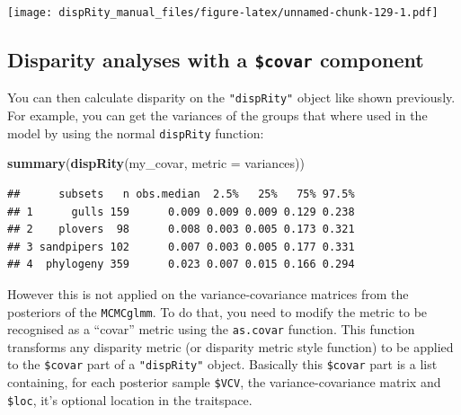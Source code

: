 \documentclass[
]{book}
\newenvironment{Shaded}{\begin{snugshade}}{\end{snugshade}}
\newcommand{\CommentTok}[1]{\textcolor[rgb]{0.56,0.35,0.01}{\textit{#1}}}
\newcommand{\DataTypeTok}[1]{\textcolor[rgb]{0.13,0.29,0.53}{#1}}
\newcommand{\DecValTok}[1]{\textcolor[rgb]{0.00,0.00,0.81}{#1}}
\newcommand{\KeywordTok}[1]{\textcolor[rgb]{0.13,0.29,0.53}{\textbf{#1}}}
\newcommand{\NormalTok}[1]{#1}
\newcommand{\OperatorTok}[1]{\textcolor[rgb]{0.81,0.36,0.00}{\textbf{#1}}}
\newcommand{\StringTok}[1]{\textcolor[rgb]{0.31,0.60,0.02}{#1}}
\begin{document}
\texttt{[image: dispRity\_manual\_files/figure-latex/unnamed-chunk-129-1.pdf]}

\hypertarget{disparity-analyses-with-a-covar-component}{%
\subsection{\texorpdfstring{Disparity analyses with a \texttt{\$covar} component}{Disparity analyses with a \$covar component}}\label{disparity-analyses-with-a-covar-component}}

You can then calculate disparity on the \texttt{"dispRity"} object like shown previously.
For example, you can get the variances of the groups that where used in the model by using the normal \texttt{dispRity} function:

\begin{Shaded}
\begin{Highlighting}[]
\KeywordTok{summary}\NormalTok{(}\KeywordTok{dispRity}\NormalTok{(my\_covar, }\DataTypeTok{metric =}\NormalTok{ variances))}
\end{Highlighting}
\end{Shaded}

\begin{verbatim}
##      subsets   n obs.median  2.5%   25%   75% 97.5%
## 1      gulls 159      0.009 0.009 0.009 0.129 0.238
## 2    plovers  98      0.008 0.003 0.005 0.173 0.321
## 3 sandpipers 102      0.007 0.003 0.005 0.177 0.331
## 4  phylogeny 359      0.023 0.007 0.015 0.166 0.294
\end{verbatim}

However this is not applied on the variance-covariance matrices from the posteriors of the \texttt{MCMCglmm}.
To do that, you need to modify the metric to be recognised as a ``covar'' metric using the \texttt{as.covar} function.
This function transforms any disparity metric (or disparity metric style function) to be applied to the \texttt{\$covar} part of a \texttt{"dispRity"} object.
Basically this \texttt{\$covar} part is a list containing, for each posterior sample \texttt{\$VCV}, the variance-covariance matrix and \texttt{\$loc}, it's optional location in the traitspace.

\begin{Shaded}
\end{Shaded}
\end{document}
